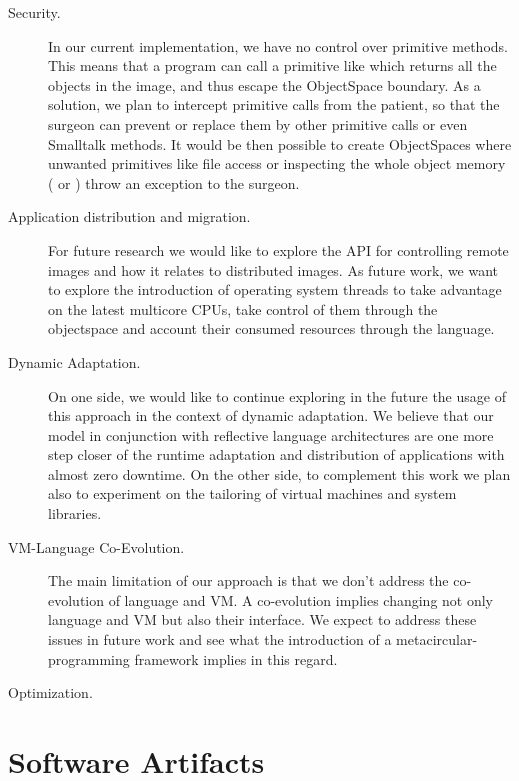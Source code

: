 \begin{description}

\item[Security.] In our current implementation, we have no control over primitive methods. This means that a program can call a primitive like  which returns all the objects in the image, and thus escape the ObjectSpace boundary.
As a solution, we plan to intercept primitive calls from the patient, so that the surgeon can prevent or replace them by other primitive calls or even Smalltalk methods.
It would be then possible to create ObjectSpaces where unwanted primitives like file access or inspecting the whole object memory ( or ) throw an exception to the surgeon.

\item[Application distribution and migration.] For future research we would like to explore the \objectspace API for controlling remote images and how it relates to distributed images.
As future work, we want to explore the introduction of operating system threads to take advantage on the latest multicore CPUs, take control of them through the objectspace and account their consumed resources through the language.

\item[Dynamic Adaptation.] On one side, we would like to continue exploring in the future the usage of this approach in the context of dynamic adaptation. We believe that our model in conjunction with reflective language architectures are one more step closer of the runtime adaptation and distribution of applications with almost zero downtime. On the other side, to complement this work we plan also to experiment on the tailoring of virtual machines and system libraries.

\item[VM-Language Co-Evolution.] The main limitation of our approach is that we don't address the co-evolution of language and VM. A co-evolution implies changing not only language and VM but also their interface. We expect to address these issues in future work and see what the introduction of a metacircular-programming framework implies in this regard.

\item[Optimization.]

\end{description}

\section{Software Artifacts}


